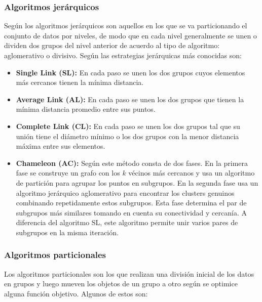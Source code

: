  \subsubsection {Algoritmos jerárquicos}
Según \cite{[PASPLASA]} los algoritmos jerárquicos son aquellos en los que se va particionando el conjunto de datos por niveles, de modo que en cada nivel generalmente se unen o dividen dos grupos del nivel anterior de acuerdo al tipo de algoritmo: aglomerativo o divisivo. Según \cite{[DUHASTO]} las estrategias jerárquicas más conocidas son:
 \begin{itemize}
 \item \textbf{Single Link (SL): }En cada paso se unen los dos grupos cuyos elementos más cercanos 
tienen la mínima distancia.
 \item \textbf{Average Link (AL): }En cada paso se unen los dos grupos que tienen la mínima distancia promedio entre sus puntos.
 \item \textbf{Complete Link (CL): }En cada paso se unen los dos grupos tal que su unión tiene el diámetro mínimo o los dos grupos con la menor distancia máxima entre sus elementos.  
\item \textbf{Chameleon (AC): } Según \cite{[KARHANKU]} este método consta de dos fases. En la primera fase se construye un grafo con los  $k$ vécinos más cercanos y usa un algoritmo de partición para agrupar los puntos en subgrupos. En la segunda fase usa un algoritmo jerárquico aglomerativo para encontrar los clusters genuinos combinando repetidamente estos subgrupos. Esta fase determina el par de subgrupos más similares tomando en cuenta su conectividad y cercanía. A diferencia del algoritmo SL, este algoritmo permite unir varios pares de subgrupos en la misma iteración.
\end{itemize}
 
\subsubsection {Algoritmos particionales}
Los algoritmos particionales son los que realizan una división inicial de los datos en grupos y luego mueven los objetos de un grupo a otro según se optimice alguna función objetivo. Algunos de estos son:
 
